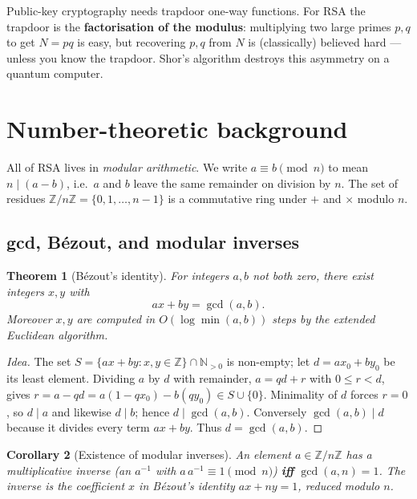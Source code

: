 \documentclass[11pt]{article}
\theoremstyle{plain}
\newtheorem{theorem}{Theorem}[section]
\newtheorem{corollary}[theorem]{Corollary}
\theoremstyle{definition}
\theoremstyle{remark}
\newcommand{\Z}{\mathbb{Z}}
\newcommand{\N}{\mathbb{N}}
\begin{document}
Public-key cryptography needs trapdoor one-way functions. For RSA the trapdoor is the
\textbf{factorisation of the modulus}: multiplying two large primes $p,q$ to get
$N=pq$ is easy, but recovering $p,q$ from $N$ is (classically) believed hard --- unless
you know the trapdoor. Shor's algorithm destroys this asymmetry on a quantum computer.

\section{Number-theoretic background}

All of RSA lives in \emph{modular arithmetic}. We write $a \equiv b \pmod n$ to mean
$n \mid (a-b)$, i.e.\ $a$ and $b$ leave the same remainder on division by $n$. The set
of residues $\Z/n\Z = \{0,1,\dots,n-1\}$ is a commutative ring under $+$ and $\times$
modulo $n$.

\subsection{gcd, B\'ezout, and modular inverses}

\begin{theorem}[B\'ezout's identity]\label{thm:bezout}
For integers $a,b$ not both zero, there exist integers $x,y$ with
\[
  ax + by = \gcd(a,b).
\]
Moreover $x,y$ are computed in $O(\log \min(a,b))$ steps by the
\emph{extended Euclidean algorithm}.
\end{theorem}

\begin{proof}[Idea]
The set $S=\{ax+by : x,y\in\Z\}\cap \N_{>0}$ is non-empty; let $d=ax_0+by_0$ be its
least element. Dividing $a$ by $d$ with remainder, $a=qd+r$ with $0\le r<d$, gives
$r=a-qd=a(1-qx_0)-b(qy_0)\in S\cup\{0\}$. Minimality of $d$ forces $r=0$, so $d\mid a$
and likewise $d\mid b$; hence $d\mid\gcd(a,b)$. Conversely $\gcd(a,b)\mid d$ because it
divides every term $ax+by$. Thus $d=\gcd(a,b)$.
\end{proof}

\begin{corollary}[Existence of modular inverses]\label{cor:inverse}
An element $a\in\Z/n\Z$ has a multiplicative inverse (an $a^{-1}$ with
$a\,a^{-1}\equiv 1 \pmod n$) \textbf{iff} $\gcd(a,n)=1$. The inverse is the coefficient
$x$ in B\'ezout's identity $ax+ny=1$, reduced modulo $n$.
\end{corollary}
\end{document}
